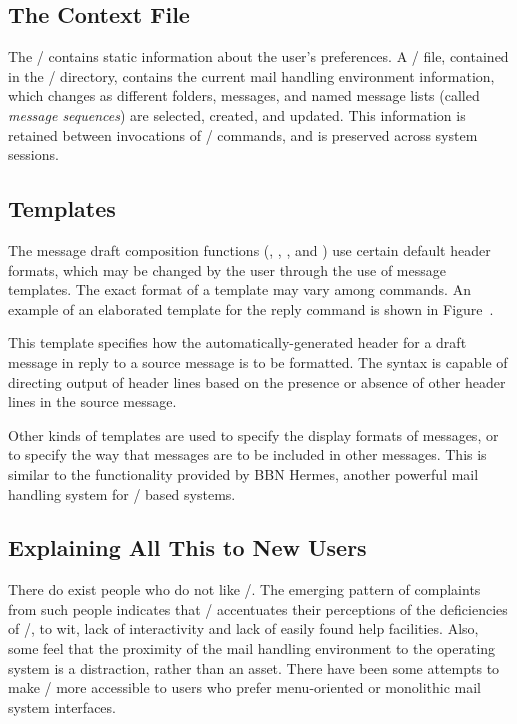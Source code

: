 \subsection{The Context File}
The \profile/ contains static information about the user's
preferences.
A \context/ file, contained in the \Mail/ directory,
contains the current mail handling environment information,
which changes as different folders, messages, and named message lists
(called {\it message sequences\/})  are selected, created, and updated.
This information is retained between invocations of \MH/ commands,
and is preserved across system sessions.

\subsection{Templates}
The message draft composition functions
(, , , and )
use certain default header formats,
which may be changed by the user through the use of message templates.
The exact format of a template may vary among commands.
An example of an elaborated template for the reply command  is
shown in Figure~\replcomps.

This template specifies how the automatically-generated header for a
draft message in reply to a source message is to be formatted.
The syntax is capable of directing output of header lines based on the
presence or absence of other header lines in the source message.

Other kinds of templates are used to specify the display formats of
messages, or to specify the way that messages are to be included in
other messages.  This is similar to the functionality provided by BBN
Hermes\cite{HERMES},
another powerful mail handling system for / based systems.

\subsection{Explaining All This to New Users}
There do exist people who do not like \MH/.%
The emerging pattern of complaints from such people indicates that \MH/
accentuates their perceptions of the deficiencies of \unix/,
to wit, lack of interactivity and lack of easily found help facilities.
Also,
some feel that the proximity of the mail handling environment to the
operating system is a distraction, rather than an asset.
There have been some attempts to make \MH/ more accessible to users who prefer
menu-oriented or monolithic mail system interfaces.%

